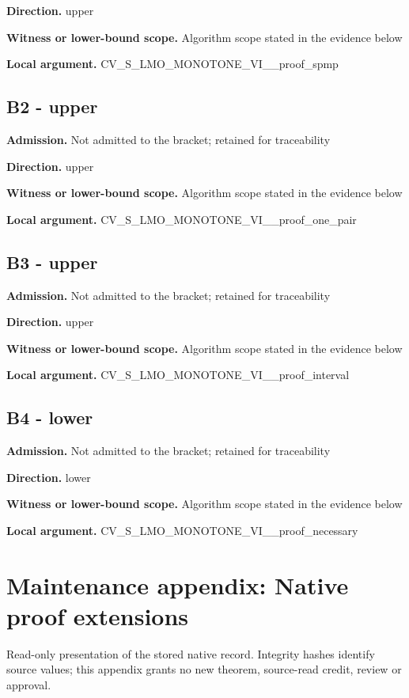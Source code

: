 \documentclass[10pt,a4paper]{article}
\begin{document}
\textbf{Direction.} upper

\textbf{Witness or lower-bound scope.} Algorithm scope stated in the evidence below

\textbf{Local argument.} CV\_\allowbreak{}S\_\allowbreak{}LMO\_\allowbreak{}MONOTONE\_\allowbreak{}VI\_\allowbreak{}\_\allowbreak{}proof\_\allowbreak{}spmp

\subsection{B2 - upper}
\textbf{Admission.} Not admitted to the bracket; retained for traceability

\textbf{Direction.} upper

\textbf{Witness or lower-bound scope.} Algorithm scope stated in the evidence below

\textbf{Local argument.} CV\_\allowbreak{}S\_\allowbreak{}LMO\_\allowbreak{}MONOTONE\_\allowbreak{}VI\_\allowbreak{}\_\allowbreak{}proof\_\allowbreak{}one\_\allowbreak{}pair

\subsection{B3 - upper}
\textbf{Admission.} Not admitted to the bracket; retained for traceability

\textbf{Direction.} upper

\textbf{Witness or lower-bound scope.} Algorithm scope stated in the evidence below

\textbf{Local argument.} CV\_\allowbreak{}S\_\allowbreak{}LMO\_\allowbreak{}MONOTONE\_\allowbreak{}VI\_\allowbreak{}\_\allowbreak{}proof\_\allowbreak{}interval

\subsection{B4 - lower}
\textbf{Admission.} Not admitted to the bracket; retained for traceability

\textbf{Direction.} lower

\textbf{Witness or lower-bound scope.} Algorithm scope stated in the evidence below

\textbf{Local argument.} CV\_\allowbreak{}S\_\allowbreak{}LMO\_\allowbreak{}MONOTONE\_\allowbreak{}VI\_\allowbreak{}\_\allowbreak{}proof\_\allowbreak{}necessary

\section{Maintenance appendix: Native proof extensions}
Read-only presentation of the stored native record. Integrity hashes identify source values; this appendix grants no new theorem, source-read credit, review or approval.
\end{document}
